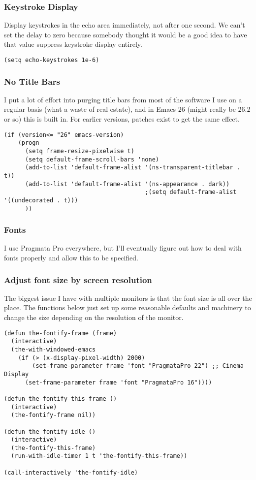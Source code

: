 \documentclass[11pt]{article}
\begin{document}
\subsubsection{Keystroke Display}
\label{sec:orge3fdc25}
Display keystrokes in the echo area immediately, not after one
second. We can't set the delay to zero because somebody thought it
would be a good idea to have that value suppress keystroke display
entirely.

\begin{verbatim}
(setq echo-keystrokes 1e-6)
\end{verbatim}

\subsubsection{No Title Bars}
\label{sec:org6b2588b}
I put a lot of effort into purging title bars from most of the
software I use on a regular basis (what a waste of real estate), and
in Emacs 26 (might really be 26.2 or so) this is built in. For earlier
versions, patches exist to get the same effect.

\begin{verbatim}
(if (version<= "26" emacs-version)
    (progn
      (setq frame-resize-pixelwise t)
      (setq default-frame-scroll-bars 'none)
      (add-to-list 'default-frame-alist '(ns-transparent-titlebar . t))
      (add-to-list 'default-frame-alist '(ns-appearance . dark))
                                        ;(setq default-frame-alist '((undecorated . t)))
      ))
\end{verbatim}

\subsubsection{Fonts}
\label{sec:org9369804}
I use Pragmata Pro everywhere, but I'll eventually figure out how to
deal with fonts properly and allow this to be specified.

\subsubsection{Adjust font size by screen resolution}
\label{sec:org2daedb1}
The biggest issue I have with multiple monitors is that the font size
is all over the place. The functions below just set up some reasonable
defaults and machinery to change the size depending on the resolution
of the monitor.

\begin{verbatim}
(defun the-fontify-frame (frame)
  (interactive)
  (the-with-windowed-emacs
    (if (> (x-display-pixel-width) 2000)
        (set-frame-parameter frame 'font "PragmataPro 22") ;; Cinema Display
      (set-frame-parameter frame 'font "PragmataPro 16"))))

(defun the-fontify-this-frame ()
  (interactive)
  (the-fontify-frame nil))

(defun the-fontify-idle ()
  (interactive)
  (the-fontify-this-frame)
  (run-with-idle-timer 1 t 'the-fontify-this-frame))

(call-interactively 'the-fontify-idle)
\end{verbatim}
\end{document}
